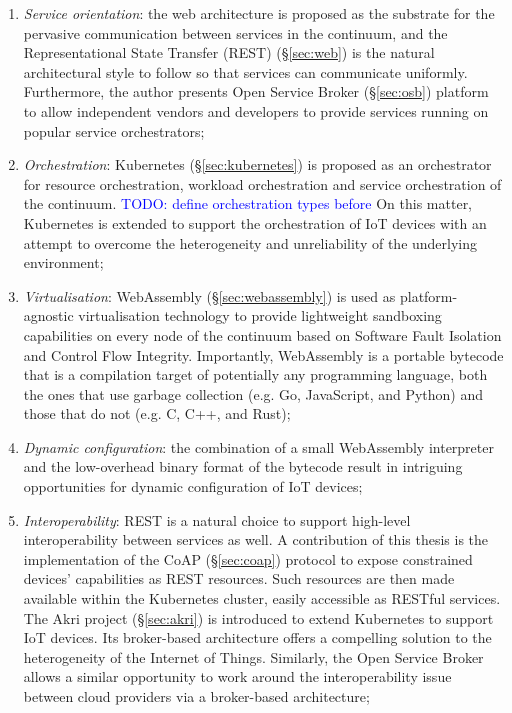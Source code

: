 \begin{enumerate}
    \item \emph{Service orientation}: the web architecture is proposed as the substrate for the pervasive communication between services in the continuum, and the Representational State Transfer (REST) (§\ref{sec:web}) is the natural architectural style to follow so that services can communicate uniformly. Furthermore, the author presents Open Service Broker (§\ref{sec:osb}) platform to allow independent vendors and developers to provide services running on popular service orchestrators;
    \item \emph{Orchestration}: Kubernetes (§\ref{sec:kubernetes}) is proposed as an orchestrator for resource orchestration, workload orchestration and service orchestration of the continuum. \textcolor{blue}{TODO: define orchestration types before} On this matter, Kubernetes is extended to support the orchestration of IoT devices with an attempt to overcome the heterogeneity and unreliability of the underlying environment;
    \item \emph{Virtualisation}: WebAssembly (§\ref{sec:webassembly}) is used as platform-agnostic virtualisation technology to provide lightweight sandboxing capabilities on every node of the continuum based on Software Fault Isolation and Control Flow Integrity. Importantly, WebAssembly is a portable bytecode that is a compilation target of potentially any programming language, both the ones that use garbage collection (e.g. Go, JavaScript, and Python) and those that do not (e.g. C, C++, and Rust);
    \item \emph{Dynamic configuration}: the combination of a small WebAssembly interpreter and the low-overhead binary format of the bytecode result in intriguing opportunities for dynamic configuration of IoT devices;
    \item \emph{Interoperability}: REST is a natural choice to support high-level interoperability between services as well. A contribution of this thesis is the implementation of the CoAP (§\ref{sec:coap}) protocol to expose constrained devices' capabilities as REST resources. Such resources are then made available within the Kubernetes cluster, easily accessible as RESTful services. The Akri project (§\ref{sec:akri}) is introduced to extend Kubernetes to support IoT devices. Its broker-based architecture offers a compelling solution to the heterogeneity of the Internet of Things. Similarly, the Open Service Broker allows a similar opportunity to work around the interoperability issue between cloud providers via a broker-based architecture;

\end{enumerate}
